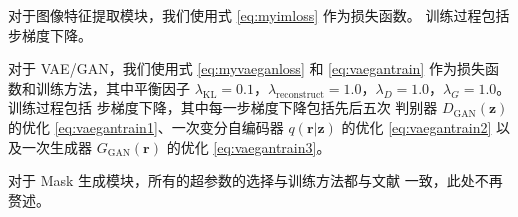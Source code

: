 对于图像特征提取模块，我们使用式 \eqref{eq:myimloss} 作为损失函数。
训练过程包括  步梯度下降。

对于 VAE/GAN，我们使用式 \eqref{eq:myvaeganloss} 和 \eqref{eq:vaegantrain} 作为损失函数和训练方法，其中平衡因子 $\lambda_{\text{KL}} = 0.1$，$\lambda_{\text{reconstruct}} = 1.0$，$\lambda_D = 1.0$，$\lambda_G = 1.0$。
训练过程包括  步梯度下降，其中每一步梯度下降包括先后五次 判别器 $D_{\text{GAN}}(\bm z)$ 的优化 \eqref{eq:vaegantrain1}、一次变分自编码器 $q(\bm r | \bm z)$ 的优化 \eqref{eq:vaegantrain2} 以及一次生成器 $G_{\text{GAN}}(\bm r)$ 的优化 \eqref{eq:vaegantrain3}。

对于 Mask 生成模块，所有的超参数的选择与训练方法都与文献  一致，此处不再赘述。



























